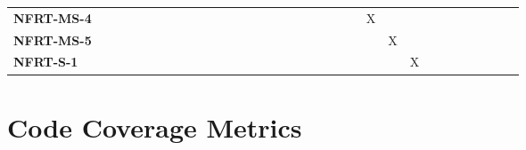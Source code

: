 \documentclass[12pt, titlepage]{article}
\begin{document}
\begin{landscape}
\begin{table}[H]
\begin{adjustbox}{width=\paperwidth}
\begin{tabular}{l|cccccccccccccccccccccc}
        \textbf{NFRT-MS-4}  & ~ & ~ & ~ & ~ & ~ & ~ & ~ & ~ & ~ & ~ & ~ & ~ & ~ & ~ & X & ~ & ~ & ~ & ~ & ~ & ~ & ~\\
        \textbf{NFRT-MS-5}  & ~ & ~ & ~ & ~ & ~ & ~ & ~ & ~ & ~ & ~ & ~ & ~ & ~ & ~ & ~ & X & ~ & ~ & ~ & ~ & ~ & ~\\
        \textbf{NFRT-S-1}   & ~ & ~ & ~ & ~ & ~ & ~ & ~ & ~ & ~ & ~ & ~ & ~ & ~ & ~ & ~ & ~ & X & ~ & ~ & ~ & ~ & ~\\
    \end{tabular}
    \end{adjustbox}
    \label{Traceability Matrix: Non-Functional Requirement}
\end{table}
\end{landscape}

\section{Code Coverage Metrics}




\end{document}
